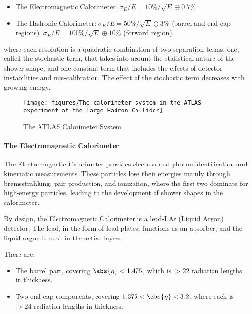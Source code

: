 \begin{itemize}

	\item The Electromagnetic Calorimeter: $\sigma_E / E = 10\% /\sqrt{E} \oplus
		      0.7\%$

	\item The Hadronic Calorimeter: $\sigma_E / E = 50\% /\sqrt{E} \oplus 3\%$
	      (barrel and end-cap regions), $\sigma_E / E = 100\% /\sqrt{E} \oplus 10\%$
	      (forward region).

\end{itemize}

where each resolution is a quadratic combination of two separation terms, one,
called the stochastic term, that takes into acount the statistical nature of
the shower shape, and one constant term that includes the effects of detector
instabilities and mis-calibration. The effect of the stochastic term decreases
with growing energy.

\begin{figure}[H]
	\texttt{[image: figures/The-calorimeter-system-in-the-ATLAS-experiment-at-the-Large-Hadron-Collider]}
	\centering
	\caption{The ATLAS Calorimeter System}\cite{atlasdetector}
	\label{f:emc}
\end{figure}

\paragraph{The Electromagnetic Calorimeter}\label{p:emc} The Electromagnetic
Calorimeter provides electron and photon identification and kinematic
measurements. These particles lose their energies mainly through
bremsstrahlung, pair production, and ionization, where the first two dominate
for high-energy particles, leading to the development of shower shapes in the
calorimeter.

By design, the Electromagnetic Calorimeter is a lead-LAr (Liquid Argon)
detector. The lead, in the form of lead plates, functions as an absorber, and
the liquid argon is used in the active layers.


\vspace{3mm}

There are:

\begin{itemize}

	\item The barrel part, covering $\abs{\eta} < 1.475 $, which is $> 22$
	      radiation lengths in thickness.

	\item Two end-cap components, covering $1.375 < \abs{\eta} < 3.2$, where each
	      is $>24$ radiation lengths in thickness.

\end{itemize}

